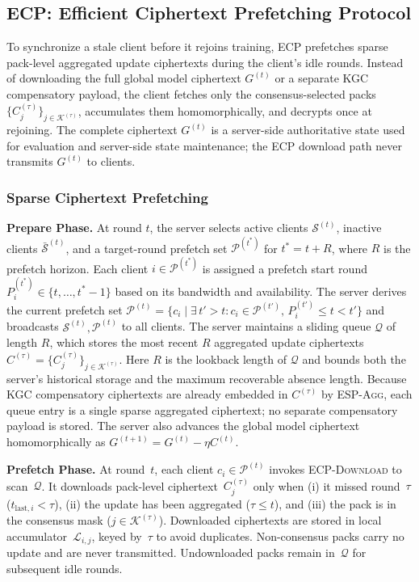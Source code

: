 \subsection{ECP: Efficient Ciphertext Prefetching Protocol}
\label{sec:ecp_protocol}

To synchronize a stale client before it rejoins training, \textsc{ECP} prefetches sparse pack-level aggregated update ciphertexts during the client's idle rounds.
Instead of downloading the full global model ciphertext $G^{(t)}$ or a separate KGC compensatory payload, the client fetches only the consensus-selected packs $\{C_j^{(\tau)}\}_{j\in\mathcal{K}^{(\tau)}}$, accumulates them homomorphically, and decrypts once at rejoining.
The complete ciphertext $G^{(t)}$ is a server-side authoritative state used for evaluation and server-side state maintenance; the ECP download path never transmits $G^{(t)}$ to clients.

\subsubsection{Sparse Ciphertext Prefetching}
\label{sssec:sparse-prefetch}

\textbf{Prepare Phase.}
At round $t$, the server selects active clients $\mathcal{S}^{(t)}$, inactive clients $\bar{\mathcal{S}}^{(t)}$, and a target-round prefetch set $\mathcal{P}^{(t^*)}$ for $t^*=t+R$, where $R$ is the prefetch horizon.
Each client $i\in\mathcal{P}^{(t^*)}$ is assigned a prefetch start round $P_i^{(t^*)}\in\{t,\dots,t^*-1\}$ based on its bandwidth and availability.
The server derives the current prefetch set $\mathcal{P}^{(t)}=\{c_i \mid \exists\, t' > t : c_i \in \mathcal{P}^{(t')},\, P_i^{(t')} \le t < t'\}$ and broadcasts $\mathcal{S}^{(t)},\mathcal{P}^{(t)}$ to all clients.
The server maintains a sliding queue $\mathcal{Q}$ of length $R$, which stores the most recent $R$ aggregated update ciphertexts $C^{(\tau)}=\{C_j^{(\tau)}\}_{j\in\mathcal{K}^{(\tau)}}$.
Here $R$ is the lookback length of $\mathcal{Q}$ and bounds both the server's historical storage and the maximum recoverable absence length.
Because KGC compensatory ciphertexts are already embedded in $C^{(\tau)}$ by \textsc{ESP-Agg}, each queue entry is a single sparse aggregated ciphertext; no separate compensatory payload is stored.
The server also advances the global model ciphertext homomorphically as $G^{(t+1)}=G^{(t)}-\eta C^{(t)}$.

\textbf{Prefetch Phase.}
At round~$t$, each client $c_i \in \mathcal{P}^{(t)}$ invokes \textsc{ECP-Download} to scan~$\mathcal{Q}$.
It downloads pack-level ciphertext~$C_j^{(\tau)}$ only when (i) it missed round~$\tau$ ($t_{\mathrm{last},i}<\tau$), (ii) the update has been aggregated ($\tau\le t$), and (iii) the pack is in the consensus mask ($j\in\mathcal{K}^{(\tau)}$).
Downloaded ciphertexts are stored in local accumulator~$\mathcal{L}_{i,j}$, keyed by~$\tau$ to avoid duplicates.
Non-consensus packs carry no update and are never transmitted.
Undownloaded packs remain in~$\mathcal{Q}$ for subsequent idle rounds.

